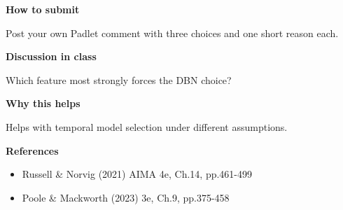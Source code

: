 \documentclass[11pt]{article}
\begin{document}
\begin{tcolorbox}[colback=white,colframe=MidnightBlue,title={Q5 Temporal Model Choice},fonttitle=\bfseries,breakable]
{\large\bfseries\color{MidnightBlue} How to submit}\par\medskip
Post your own Padlet comment with three choices and one short reason each.

{\large\bfseries\color{MidnightBlue} Discussion in class}\par\medskip
Which feature most strongly forces the DBN choice?

{\large\bfseries\color{MidnightBlue} Why this helps}\par\medskip
Helps with temporal model selection under different assumptions.

{\large\bfseries\color{MidnightBlue} References}\par\medskip
\begin{itemize}\item Russell \& Norvig (2021) AIMA 4e, Ch.14, pp.461-499
\item Poole \& Mackworth (2023) 3e, Ch.9, pp.375-458\end{itemize}
\end{tcolorbox}
\end{document}
